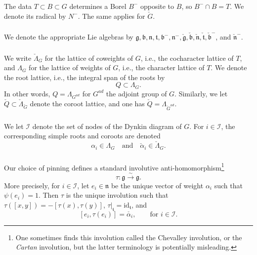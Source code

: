 \documentclass[11pt,reqno]{amsart}
\newcommand{\halpha}{\check{\alpha}}
\newcommand{\ft}{\mathfrak{t}}
\newcommand{\id}{\text{id}}
\newcommand{\fg}{\mathfrak{g}}
\newcommand{\fb}{\mathfrak{b}}
\newcommand{\fn}{\mathfrak{n}}
\theoremstyle{remark}
\numberwithin{equation}{section}
\newcommand{\xar}[1]{\xrightarrow{#1}}
\begin{document}
\subsubsection{}

The data $T \subset B \subset G$ determines a Borel
$B^-$ opposite to $B$, so $B^- \cap B = T$. We denote its
radical by $N^-$. The same applies for $\check{G}$.


\subsubsection{}

We denote the appropriate Lie algebras by 
$\fg, \fb, \fn, \ft, \fb^-, \fn^-, \check{\fg}, \check{\fb}, 
\check{\fn}, \check{\ft}, \check{\fb}^-$, and $\check{\fn}^-$.

\subsubsection{}

We write $\check{\Lambda}_G$ for the lattice
of coweights of $G$, i.e., the cocharacter lattice 
of $T$, and $\Lambda_G$ for the lattice of weights
of $G$, i.e., the character lattice of $T$. We denote the root lattice,
i.e., the integral span of the roots by \[Q \subset \Lambda_G.\]
In other words, $Q = \Lambda_{G^{ad}}$ for $G^{ad}$ the
adjoint group of $G$. Similarly, we let  
$\check{Q} \subset \check{\Lambda}_{\check{G}}$ denote the coroot lattice, and 
one has  $\check{Q} = 
\Lambda_{\check{G}^{ad}}$. 
\subsubsection{}
We let $\mathscr{I}$ denote the set of nodes of the
Dynkin diagram of $G$.
For $i \in \mathscr{I}$, the corresponding 
simple roots and coroots are denoted 
%
\[
\alpha_i \in \Lambda_G \quad \text{and} \quad \halpha_i \in \check{\Lambda}_G. 
\] 

\subsubsection{}\label{ss:involution}

Our choice of pinning defines a standard
involutive anti-homomorphism\footnote{One sometimes
	finds this involution called the Chevalley involution, or the \emph{Cartan} 
	involution,
	but the latter terminology is potentially misleading.}  \[\tau:\fg 
	\xar{\sim} \fg.\]
More precisely, for $i \in \mathscr{I}$, let
$e_i \in \fn$ be the unique vector of weight $\alpha_i$
such that $\psi(e_i) = 1$. 
Then $\tau$ is the unique involution such that
$\tau([x,y]) = -[\tau(x),\tau(y)]$,
$\tau|_{\ft} = \id_{\ft}$, and
\[[e_i,\tau(e_i)] = \check{\alpha_i}, \quad \quad \text{for } i \in 
\mathscr{I}.\]
\end{document}
